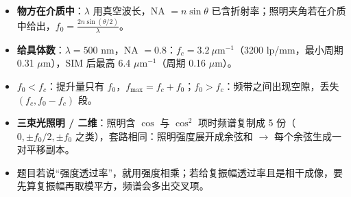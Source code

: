 \begin{warn}[变式]
\begin{itemize}
\item \textbf{物方在介质中}：$\lambda$ 用真空波长，NA $=n\sin\theta$ 已含折射率；照明夹角若在介质中给出，$f_0=\frac{2n\sin(\theta/2)}{\lambda}$。
\item \textbf{给具体数}：$\lambda=500$ nm，NA $=0.8$：$f_c=3.2\ \mu\text{m}^{-1}$（3200 lp/mm，最小周期 0.31 $\mu$m），SIM 后最高 6.4 $\mu$m$^{-1}$（周期 0.16 $\mu$m）。
\item \textbf{$f_0<f_c$}：提升量只有 $f_0$，$f_{\max}=f_c+f_0$；\textbf{$f_0>f_c$}：频带之间出现空隙，丢失 $(f_c,f_0-f_c)$ 段。
\item \textbf{三束光照明 / 二维}：照明含 $\cos$ 与 $\cos^2$ 项时频谱复制成 5 份（$0,\pm f_0/2,\pm f_0$ 之类），套路相同：照明强度展开成余弦和 $\to$ 每个余弦生成一对平移副本。
\item 题目若说“强度透过率”，就用强度相乘；若给复振幅透过率且是相干成像，要先算复振幅再取模平方，频谱会多出交叉项。
\end{itemize}
\end{warn}

